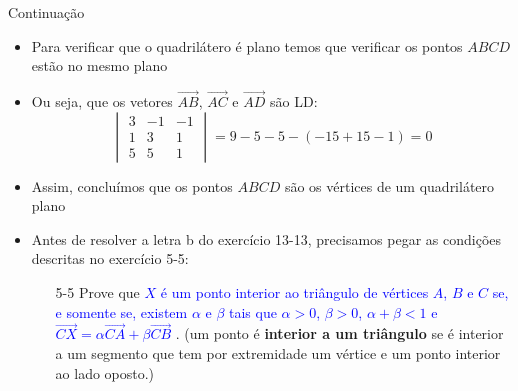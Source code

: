 \begin{frame}{Continuação}
    \begin{itemize}
        \item Para verificar que o quadrilátero é plano temos que verificar os pontos \(ABCD\) estão no mesmo plano
        \item Ou seja, que os vetores \(\vec{AB}\), \(\vec{AC}\) e \(\vec{AD}\) são LD:
            \[
                \begin{vmatrix}
                    3 & -1 & -1 \\
                    1 & 3 & 1 \\
                    5 & 5 & 1
                \end{vmatrix}
                =9-5-5-(-15+15-1)=0
            \]
        \item Assim, concluímos que os pontos \(ABCD\) são os vértices de um quadrilátero plano
        \item Antes de resolver a letra b do exercício 13-13, precisamos pegar as condições descritas
            no exercício 5-5:
            \begin{itemize}
                \item [5-5] Prove que 
                    \textcolor{blue}{
                        \(X\) é um ponto interior ao triângulo de vértices \(A\), \(B\) e \(C\) 
                        se, e somente se, existem \(\alpha\) e \(\beta\) tais que 
                        \(\alpha > 0\), \(\beta > 0\), \(\alpha+\beta<1\) e 
                        \(\vec{CX}=\alpha \vec{CA}+\beta \vec{CB}\)
                    }. 
                    (um ponto é \textbf{interior a um triângulo} se é interior a um segmento que tem por extremidade um vértice e um 
                    ponto interior ao lado oposto.)
            \end{itemize}
    \end{itemize}
\end{frame}


